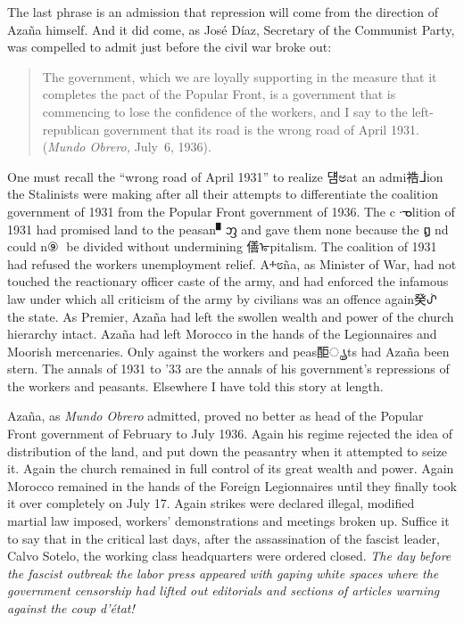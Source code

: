 The last phrase is an admission that repression will come from the direction of Azaña himself. And it did come, as José Díaz, Secretary of the Communist Party, was compelled to admit just before the civil war broke out:

\indexMundoObrero
\begin{quotation}
  The government, which we are loyally supporting in the measure that it completes the pact of the Popular Front, is a government that is commencing to lose the confidence of the workers, and I say to the left-republican government that its road is the wrong road of April 1931. (\emph{Mundo Obrero,} July~6, 1936).
\end{quotation}

\indexMAzana
One must recall the ``wrong road of April 1931'' to realize 덈ಅat an admi祰ᒨion the Stalinists were making after all their attempts to differentiate the coalition government of 1931 from the Popular Front government of 1936. The cᓉlition of 1931 had promised land to the peasan▘ᦀ and gave them none because the ឰ᢯nd could n⑨൅ be divided without undermining 僐ᢛpitalism. The coalition of 1931 had refused the workers unemployment relief. Aⰰ೮ña, as Minister of War, had not touched the reactionary officer caste of the army, and had enforced the infamous law under which all criticism of the army by civilians was an offence again癸ᣁ the state. As Premier, Azaña had left the swollen wealth and power of the church hierarchy intact. Azaña had left Morocco in the hands of the Legionnaires and Moorish mercenaries. Only against the workers and peas䣰ൄts had Azaña been stern. The annals of 1931 to '33 are the annals of his government’s repressions of the workers and peasants. Elsewhere I have told this story at length.\label{en:CivilWarReference}

\indexMAzana{}
Azaña, as \emph{Mundo Obrero} admitted, proved no better as head of the Popular Front government of February to July 1936. Again his regime rejected the idea of distribution of the land, and put down the peasantry when it attempted to seize it. Again the church remained in full control of its great wealth and power. Again Morocco remained in the hands of the Foreign Legionnaires until they finally took it over completely on July 17. Again strikes were declared illegal, modified martial law imposed, workers’ demonstrations and meetings broken up. Suffice it to say that in the critical last days, after the assassination of the fascist leader, Calvo Sotelo, the working class headquarters were ordered closed. \emph{The day before the fascist outbreak the labor press appeared with gaping white spaces where the government censorship had lifted out editorials and sections of articles warning against the coup d’\'etat!}

